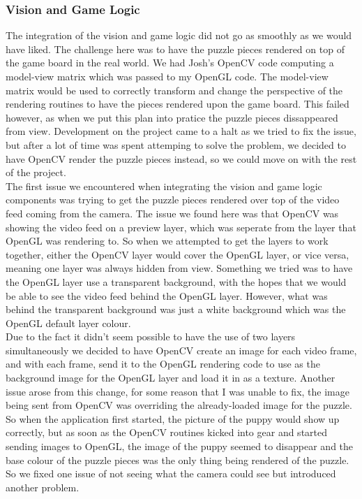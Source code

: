 \documentclass{article}
\begin{document}
\subsubsection{Vision and Game Logic}
The integration of the vision and game logic did not go as smoothly as we would
have liked. The challenge here was to have the puzzle pieces rendered on top of
the game board in the real world. We had Josh's OpenCV code computing a
model-view matrix which was passed to my OpenGL code. The model-view matrix
would be used to correctly transform and change the perspective of the rendering
routines to have the pieces rendered upon the game board. This failed however,
as when we put this plan into pratice the puzzle pieces dissappeared from
view. Development on the project came to a halt as we tried to fix the issue,
but after a lot of time was spent attemping to solve the problem, we decided to
have OpenCV render the puzzle pieces instead, so we could move on with the rest
of the project.\\

\iffalse
The first issue we encountered when integrating the vision and game logic
components was trying to get the puzzle pieces rendered over top of the video feed
coming from the camera. The issue we found here was that OpenCV was showing the
video feed on a preview layer, which was seperate from the layer that OpenGL was
rendering to. So when we attempted to get the layers to work together, either
the OpenCV layer would cover the OpenGL layer, or vice versa, meaning one layer
was always hidden from view. Something we tried was to have the OpenGL layer use
a transparent background, with the hopes that we would be able to see the video
feed behind the OpenGL layer. However, what was behind the transparent
background was just a white background which was the OpenGL default layer
colour.\\

Due to the fact it didn't seem possible to have the use of two layers
simultaneously we decided to have OpenCV create an image for each video frame,
and with each frame, send it to the OpenGL rendering code to use as the
background image for the OpenGL layer and load it in as a texture. Another issue
arose from this change, for some reason that I was unable to fix, the image
being sent from OpenCV was overriding the already-loaded image for the
puzzle. So when the application first started, the picture of the puppy would
show up correctly, but as soon as the OpenCV routines kicked into gear and
started sending images to OpenGL, the image of the puppy seemed to disappear and
the base colour of the puzzle pieces was the only thing being rendered of the
puzzle. So we fixed one issue of not seeing what the camera could see but
introduced another problem.\\
\end{document}
